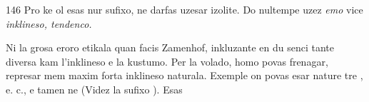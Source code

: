 \begin{VUpage}[150]{146}
Pro ke ol esas nur sufixo,  ne darfas uzesar izolite.\nl
Do nultempe uzez \textit{emo} vice \textit{inklineso, tendenco.}

Ni  la grosa eroro etikala quan facis Zamenhof,\nl
inkluzante en  du senci tante diversa kam l'inklineso\nl
e la kustumo. Per la volado, homo povas frenagar, represar\nl
mem maxim forta inklineso naturala. Exemple on povas\nl
esar nature tre , e. c., e tamen\nl
ne  (Videz la sufixo ). Esas\parplein
\end{VUpage}

